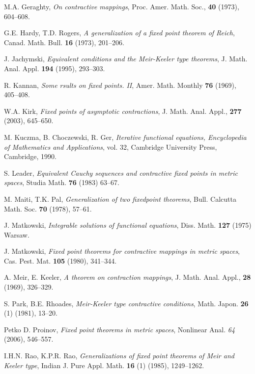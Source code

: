 \documentclass[a4paper,10pt,twoside,reqno]{amsart}
\theoremstyle{definition}
\theoremstyle{remark}
\numberwithin{equation}{section}
\begin{document}
\begin{thebibliography}{99}
  M.A. Geraghty,
  \textit{On contractive mappings},
  Proc. Amer. Math. Soc., \textbf{40} (1973), 604--608.

  G.E. Hardy, T.D. Rogers,
  \textit{A generalization of a fixed point theorem of Reich},
  Canad. Math. Bull. \textbf{16} (1973), 201--206.

  J. Jachymski,
  \textit{Equivalent conditions and the Meir-Keeler type theorems},
  J. Math. Anal. Appl. \textbf{194} (1995), 293--303.

  R. Kannan,
  \textit{Some rsults on fixed points. II},
  Amer. Math. Monthly \textbf{76} (1969), 405--408.

  W.A. Kirk,
  \textit{Fixed points of asymptotic contractions},
  J. Math. Anal. Appl., \textbf{277} (2003), 645--650.

  M. Kuczma, B. Choczewski, R. Ger,
  \textit{Iterative functional equations, Encyclopedia of Mathematics and Applications},
  vol. 32, Cambridge University Press, Cambridge, 1990.

  S. Leader,
  \textit{Equivalent Cauchy sequences and contractive fixed points in metric spaces},
  Studia Math. \textbf{76} (1983) 63--67.

  M. Maiti, T.K. Pal,
  \textit{Generalization of two fixedpoint theorems},
  Bull. Calcutta Math. Soc. \textbf{70} (1978), 57--61.

  J. Matkowski,
  \textit{Integrable solutions of functional equations},
  Diss. Math. \textbf{127} (1975) Warsaw.

  J. Matkowski,
  \textit{Fixed point theorems for contractive mappings in metric spaces},
  Cas. Pest. Mat. \textbf{105} (1980), 341--344.

  A. Meir, E. Keeler,
  \textit{A theorem on contraction mappings},
  J. Math. Anal. Appl., \textbf{28} (1969), 326--329.

  S. Park, B.E. Rhoades,
  \textit{Meir-Keeler type contractive conditions},
  Math. Japon. \textbf{26} (1) (1981), 13--20.

  Petko D. Proinov,
  \textit{Fixed point theorems in metric spaces},
  Nonlinear Anal. \textit{64} (2006), 546--557.

  I.H.N. Rao, K.P.R. Rao,
  \textit{Generalizations of fixed point theorems of Meir and Keeler type},
  Indian J. Pure Appl. Math. \textbf{16} (1) (1985), 1249--1262.


\end{thebibliography}
\end{document}
